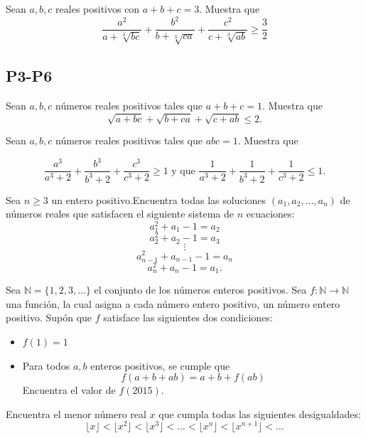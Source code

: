 \documentclass[11pt]{scrartcl}
\begin{document}
\begin{problem}
[2014/5] Sean $a,b,c$ reales positivos con $a+b+c=3$. Muestra que 
$$\frac{a^2}{a+\sqrt[3]{bc}}+\frac{b^2}{b+\sqrt[3]{ca}}+\frac{c^2}{c+\sqrt[3]{ab}}\geq \frac 3 2$$
\end{problem}

\subsection{P3-P6}
\begin{problem} [2007/3]

    Sean $a,b,c$ números reales positivos tales que $a+b+c=1$. Muestra que 
\[\sqrt{a+bc}+\sqrt{b+ca}+\sqrt{c+ab}\leq 2.\]
    
\end{problem}

\begin{problem} [2009/3]

    Sean $a,b,c$ números reales positivos tales que $abc=1$. Muestra que

\[\frac{a^3}{a^3+2}+\frac{b^3}{b^3+2}+\frac{c^3}{c^3+2}\ge1\text{ y que }\frac1{a^3+2}+\frac1{b^3+2}+\frac1{c^3+2}\le1.\]
    
\end{problem}
\begin{problem}
[2011/3] Sea $n\geq 3$ un entero positivo.Encuentra todas las soluciones $(a_1,a_2,\ldots,a_n)$ de números reales que satisfacen el siguiente sistema de $n$ ecuaciones:
$$a_1^2+a_1-1=a_2$$
$$a_2^2+a_2-1=a_3$$
$$\vdots$$
$$a_{n-1}^2+a_{n-1}-1=a_n$$
$$a_n^2+a_n-1=a_1.$$
\end{problem}

\begin{problem}
[2015/3] Sea $\mathbb{N}=\{ 1,2,3,\ldots \}$ el conjunto de los números enteros positivos. Sea $f: \mathbb{N} \rightarrow \mathbb{N}$ una función, la cual asigna a cada número entero positivo, un número entero positivo. Supón que $f$ satisface las siguientes dos condiciones: 
\begin{itemize}
\item $f(1)=1$
\item Para todos $a,b$ enteros positivos, se cumple que 
$$f(a+b+ab)=a+b+f(ab)$$
Encuentra el valor de $f(2015)$.
\end{itemize}
\end{problem}

\begin{problem}
[2016/3] Encuentra el menor número real $x$ que cumpla todas las siguientes desigualdades: 
$$\lfloor x \rfloor < \lfloor x^2 \rfloor <\lfloor x^3 \rfloor < \ldots < \lfloor x^n \rfloor < \lfloor x^{n+1} \rfloor <\ldots$$
\end{problem}
\end{document}
